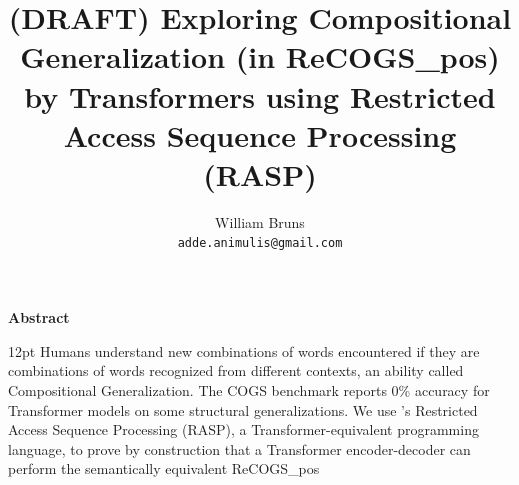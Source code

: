 \documentclass[11pt]{article}
\makeatletter
\renewenvironment{abstract}{\begin{center}\large\textbf{Abstract}\end{center}\begin{list}{}{\setlength{\rightmargin}{0.55cm}\setlength{\leftmargin}{0.55cm}}\item[]\ignorespaces\@setsize\normalsize{12pt}\xpt\@xpt}{\unskip\end{list}}
\makeatother
\begin{document}
\title{(DRAFT) Exploring Compositional Generalization (in ReCOGS\_pos) by Transformers using Restricted Access Sequence Processing (RASP)}

\author{William Bruns \\
  \texttt{adde.animulis@gmail.com}
}
\date{}

\maketitle

\begin{abstract}
Humans understand new combinations of words encountered if they are combinations of words recognized from different contexts, an ability called Compositional Generalization.
The COGS benchmark \citep{KimLinzen2020} reports 0\% accuracy for Transformer models on some structural generalizations.
We use \citep{Weiss2021}'s Restricted Access Sequence Processing (RASP), a Transformer-equivalent programming language, to prove by construction that a Transformer encoder-decoder
can perform the semantically equivalent ReCOGS\_pos

\end{abstract}
\end{document}

